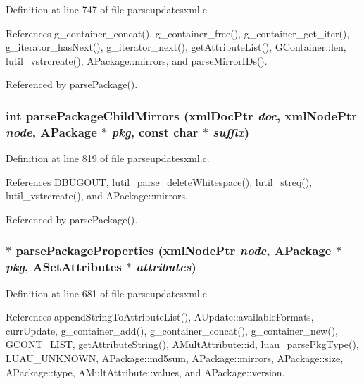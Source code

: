 Definition at line 747 of file parseupdatesxml.c.

References g\_\-container\_\-concat(), g\_\-container\_\-free(), g\_\-container\_\-get\_\-iter(), g\_\-iterator\_\-has\-Next(), g\_\-iterator\_\-next(), get\-Attribute\-List(), GContainer::len, lutil\_\-vstrcreate(), APackage::mirrors, and parse\-Mirror\-IDs().

Referenced by parse\-Package().
\subsubsection{\setlength{\rightskip}{0pt plus 5cm}int parse\-Package\-Child\-Mirrors (xml\-Doc\-Ptr {\em doc}, xml\-Node\-Ptr {\em node}, {\bf APackage} $\ast$ {\em pkg}, const char $\ast$ {\em suffix})\hspace{0.3cm}{\tt  [static]}}\label{parseupdatesxml_8c_a19}




Definition at line 819 of file parseupdatesxml.c.

References DBUGOUT, lutil\_\-parse\_\-delete\-Whitespace(), lutil\_\-streq(), lutil\_\-vstrcreate(), and APackage::mirrors.

Referenced by parse\-Package().
\subsubsection{ $\ast$ parse\-Package\-Properties (xml\-Node\-Ptr {\em node}, {\bf APackage} $\ast$ {\em pkg}, {\bf ASet\-Attributes} $\ast$ {\em attributes})\hspace{0.3cm}{\tt  [static]}}\label{parseupdatesxml_8c_a17}




Definition at line 681 of file parseupdatesxml.c.

References append\-String\-To\-Attribute\-List(), AUpdate::available\-Formats, curr\-Update, g\_\-container\_\-add(), g\_\-container\_\-concat(), g\_\-container\_\-new(), GCONT\_\-LIST, get\-Attribute\-String(), AMult\-Attribute::id, luau\_\-parse\-Pkg\-Type(), LUAU\_\-UNKNOWN, APackage::md5sum, APackage::mirrors, APackage::size, APackage::type, AMult\-Attribute::values, and APackage::version.


